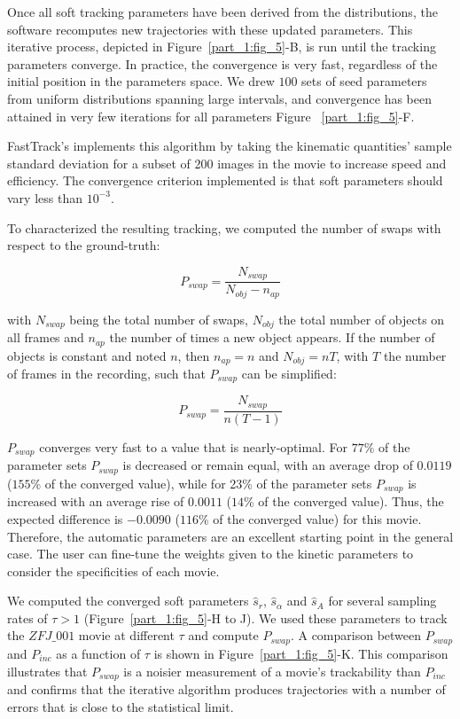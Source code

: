    Once all soft tracking parameters have been derived from the distributions, the software recomputes new trajectories with these updated parameters. This iterative process, depicted in Figure~\ref{part_1:fig_5}-B, is run until the tracking parameters converge. In practice, the convergence is very fast, regardless of the initial position in the parameters space. We drew $100$ sets of seed parameters from uniform distributions spanning large intervals, and convergence has been attained in very few iterations for all parameters Figure ~\ref{part_1:fig_5}-F.

    FastTrack's implements this algorithm by taking the kinematic quantities' sample standard deviation for a subset of 200 images in the movie to increase speed and efficiency. The convergence criterion implemented is that soft parameters should vary less than $10^{-3}$.

    To characterized the resulting tracking, we computed the number of swaps with respect to the ground-truth:

    \begin{equation}
    P_{swap} = \frac{N_{swap}}{N_{obj} - n_{ap}}
    \label{eq:Pswap}
    \end{equation}

    \noindent with $N_{swap}$ being the total number of swaps, $N_{obj}$ the total number of objects on all frames and $n_{ap}$ the number of times a new object appears. If the number of objects is constant and noted $n$, then $n_{ap} = n$ and $N_{obj} = nT$, with $T$ the number of frames in the recording, such that $P_{swap}$ can be simplified:

    \begin{equation}
    P_{swap} = \frac{N_{swap}}{n(T-1)}
    \label{eq:Pswap_constant}
    \end{equation}

    $P_{swap}$ converges very fast to a value that is nearly-optimal. For $77\%$ of the parameter sets $P_{swap}$ is decreased or remain equal, with an average drop of $0.0119$ ($155$\% of the converged value), while for 23\% of the parameter sets $P_{swap}$ is increased with an average rise of $0.0011$ ($14$\% of the converged value). Thus, the expected difference is $-0.0090$ ($116$\% of the converged value) for this movie. Therefore, the automatic parameters are an excellent starting point in the general case. The user can fine-tune the weights given to the kinetic parameters to consider the specificities of each movie.

    We computed the converged soft parameters $\hat{s}_r$, $\hat{s}_\alpha$ and $\hat{s}_A$ for several sampling rates of $\tau>1$ (Figure~\ref{part_1:fig_5}-H to J). We used these parameters to track the $ZFJ\_001$ movie at different $\tau$ and compute $P_{swap}$. A comparison between $P_{swap}$ and $P_{inc}$ as a function of $\tau$ is shown in Figure~\ref{part_1:fig_5}-K. This comparison illustrates that $P_{swap}$ is a noisier measurement of a movie's trackability than $P_{inc}$ and confirms that the iterative algorithm produces trajectories with a number of errors that is close to the statistical limit.

